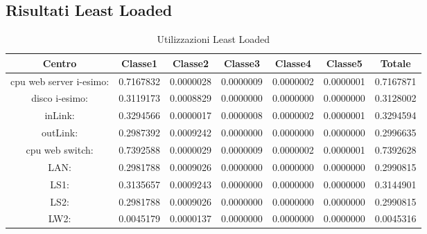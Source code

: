 \subsection{Risultati Least Loaded}
\begin{table}[H]
\begin{center}\begin{scriptsize}
\begin{tabular}{||c|c|c|c|c|c|c||}
\hline
Centro &Classe1 &Classe2 &Classe3 &Classe4 &Classe5 &Totale\\
\hline
\hline
 cpu web server i-esimo: 	&0.7167832	&0.0000028	&0.0000009	&0.0000002	&0.0000001	&0.7167871\\
\hline
 disco i-esimo: 	&0.3119173	&0.0008829	&0.0000000	&0.0000000	&0.0000000	&0.3128002\\
\hline
 inLink: 	&0.3294566	&0.0000017	&0.0000008	&0.0000002	&0.0000001	&0.3294594\\
\hline
 outLink: 	&0.2987392	&0.0009242	&0.0000000	&0.0000000	&0.0000000	&0.2996635\\
\hline
 cpu web switch: 	&0.7392588	&0.0000029	&0.0000009	&0.0000002	&0.0000001	&0.7392628\\
\hline
 LAN: 	&0.2981788	&0.0009026	&0.0000000	&0.0000000	&0.0000000	&0.2990815\\
\hline
 LS1: 	&0.3135657	&0.0009243	&0.0000000	&0.0000000	&0.0000000	&0.3144901\\
\hline
 LS2:	&0.2981788	&0.0009026	&0.0000000	&0.0000000	&0.0000000	&0.2990815\\
\hline
 LW2: 	&0.0045179	&0.0000137	&0.0000000	&0.0000000	&0.0000000	&0.0045316\\
\hline
\end{tabular}
\end{scriptsize}\end{center}
\caption{Utilizzazioni Least Loaded}
\label{utilizzazioni}
\end{table}

